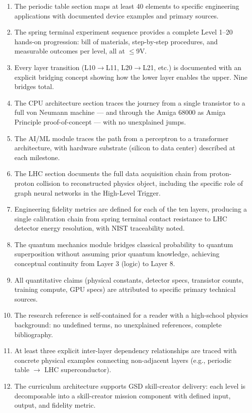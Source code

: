 \documentclass[11pt,letterpaper]{article}
\begin{document}
\begin{enumerate}[leftmargin=*, label=\textbf{SC-\arabic*.}]
  \item The periodic table section maps at least 40 elements to specific engineering applications with documented device examples and primary sources.
  \item The spring terminal experiment sequence provides a complete Level 1--20 hands-on progression: bill of materials, step-by-step procedures, and measurable outcomes per level, all at $\leq$9V.
  \item Every layer transition (L10$\rightarrow$L11, L20$\rightarrow$L21, etc.) is documented with an explicit bridging concept showing how the lower layer enables the upper. Nine bridges total.
  \item The CPU architecture section traces the journey from a single transistor to a full von Neumann machine --- and through the Amiga 68000 as Amiga Principle proof-of-concept --- with no unexplained jumps.
  \item The AI/ML module traces the path from a perceptron to a transformer architecture, with hardware substrate (silicon to data center) described at each milestone.
  \item The LHC section documents the full data acquisition chain from proton-proton collision to reconstructed physics object, including the specific role of graph neural networks in the High-Level Trigger.
  \item Engineering fidelity metrics are defined for each of the ten layers, producing a single calibration chain from spring terminal contact resistance to LHC detector energy resolution, with NIST traceability noted.
  \item The quantum mechanics module bridges classical probability to quantum superposition without assuming prior quantum knowledge, achieving conceptual continuity from Layer 3 (logic) to Layer 8.
  \item All quantitative claims (physical constants, detector specs, transistor counts, training compute, GPU specs) are attributed to specific primary technical sources.
  \item The research reference is self-contained for a reader with a high-school physics background: no undefined terms, no unexplained references, complete bibliography.
  \item At least three explicit inter-layer dependency relationships are traced with concrete physical examples connecting non-adjacent layers (e.g., periodic table $\rightarrow$ LHC superconductor).
  \item The curriculum architecture supports GSD skill-creator delivery: each level is decomposable into a skill-creator mission component with defined input, output, and fidelity metric.
\end{enumerate}
\end{document}
